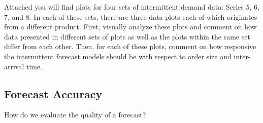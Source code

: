 \begin{exercise} \label{inter} 
Attached you will find plots for four sets of intermittent demand data: Series 5, 6, 7, and 8. In each of these sets, there are three data plots each of which originates from a different product. First, visually analyze these plots and comment on how data presented in different sets of plots as well as the plots within the same set differ from each other. Then, for each of these plots, comment on how responsive the intermittent forecast models should be with respect to order size and inter-arrival time.

\end{exercise}

%
%
%
%
%
%
%
%   


\subsection{Forecast Accuracy}

\begin{exercise}
How do we evaluate the quality of a forecast?

\end{exercise}


